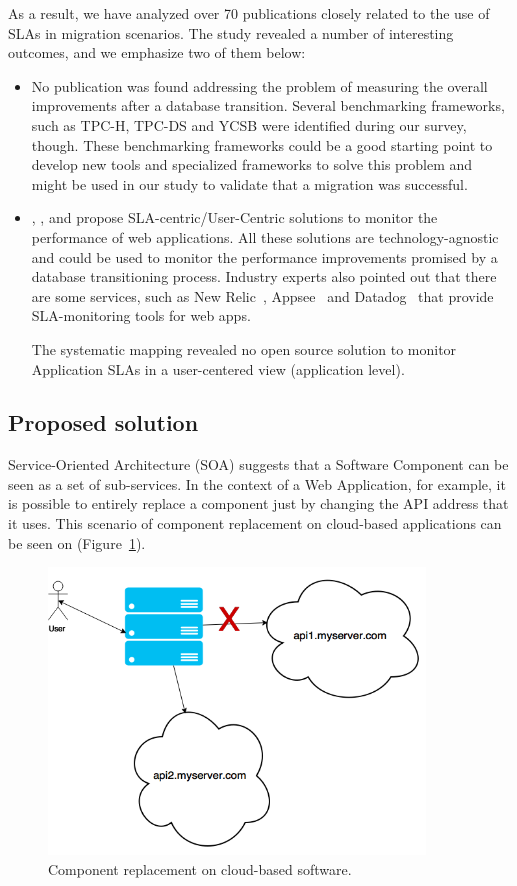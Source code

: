 \documentclass{article}
\begin{document}
As a result, we have analyzed over 70 publications closely related to the use of SLAs in migration scenarios. The study revealed a number of interesting outcomes, and we emphasize two of them below:

\begin{itemize}
\item{No publication was found addressing the problem of measuring the overall improvements after a database transition. Several benchmarking frameworks, such as TPC-H, TPC-DS and YCSB were identified\cite{6616442} during our survey, though. These benchmarking frameworks could be a good starting point to develop new tools and specialized frameworks to solve this problem and might be used in our study to validate that a migration was successful.
}

\item{ \cite{6253526}, \cite{6461875}, \cite{6511780} and \cite{Xiong:2011:APA:2038916.2038931} propose SLA-centric/User-Centric solutions to monitor the performance of web applications. All these solutions are technology-agnostic and could be used to monitor the performance improvements promised by a database transitioning process. Industry experts also pointed out that there are some services, such as New Relic~\cite{newrelic}, Appsee~\cite{appsee} and Datadog~\cite{datadog} that provide SLA-monitoring tools for web apps. 

The systematic mapping revealed no open source solution to monitor Application SLAs in a user-centered view (application level).  
}

\end{itemize}

\subsection{Proposed solution}

Service-Oriented Architecture (SOA) suggests that a Software Component can be seen as a set of sub-services. In the context of a Web Application, for example, it is possible to entirely replace a component just by changing the API address that it uses. This scenario of component replacement on cloud-based applications can be seen on (Figure~\ref{fig:apireplacement}).

\begin{figure}[ht!]
\centering
\includegraphics[width=100mm]{api.png}
\caption{Component replacement on cloud-based software.\label{fig:apireplacement}}
\end{figure}
\end{document}
